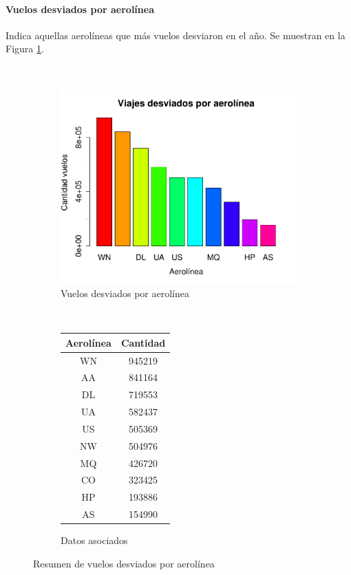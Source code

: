 \documentclass[12pt]{article}
\numberwithin{equation}{section}
\numberwithin{table}{section}
\numberwithin{figure}{section}
\begin{document}
\paragraph{Vuelos desviados por aerolínea}
Indica aquellas aerolíneas que más vuelos desviaron en el año.
Se muestran en la Figura \ref{fig:desviados-por-aerolinea}.

\begin{figure}
        \centering
        ~
        \begin{subfigure}[b]{0.6\textwidth}
                \includegraphics[width=1\columnwidth]{imagenes/desviados/viajes-desviados-por-aerolinea}
                \caption{Vuelos desviados por aerolínea}
        \end{subfigure}
        ~
        \begin{subfigure}[b]{0.3\textwidth}
\begin{tabular}{@{}cc@{}}
\toprule
\textbf{Aerolínea} & \textbf{Cantidad} \\ \midrule
WN                 & 945219            \\
AA                 & 841164            \\
DL                 & 719553            \\
UA                 & 582437            \\
US                 & 505369            \\
NW                 & 504976            \\
MQ                 & 426720            \\
CO                 & 323425            \\
HP                 & 193886            \\
AS                 & 154990            \\ \bottomrule
\end{tabular}
                \caption{Datos asociados}
        \end{subfigure}
        \caption{Resumen de vuelos desviados por aerolínea}
        \label{fig:desviados-por-aerolinea}
\end{figure}
\end{document}

